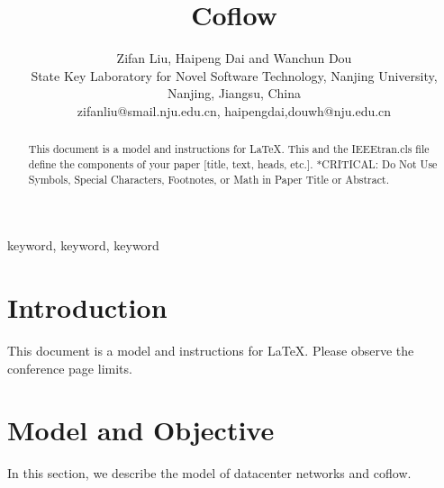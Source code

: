 \documentclass[10pt, conference, letterpaper]{IEEEtran}
\begin{document}
\title{Coflow}

\author{Zifan Liu, Haipeng Dai and Wanchun Dou\\
State Key Laboratory for Novel Software Technology, Nanjing University, Nanjing, Jiangsu, China\\
zifanliu@smail.nju.edu.cn, haipengdai,douwh@nju.edu.cn}

\maketitle

\begin{abstract}
This document is a model and instructions for \LaTeX.
This and the IEEEtran.cls file define the components of your paper [title, text, heads, etc.]. *CRITICAL: Do Not Use Symbols, Special Characters, Footnotes,
or Math in Paper Title or Abstract.
\end{abstract}

\begin{IEEEkeywords}
keyword, keyword, keyword
\end{IEEEkeywords}

\section{Introduction}
This document is a model and instructions for \LaTeX.\cite{HUG}
Please observe the conference page limits.

\section{Model and Objective}
In this section, we describe the model of datacenter networks and coflow.
\end{document}
